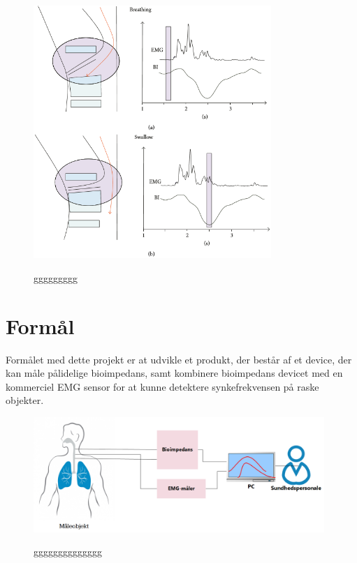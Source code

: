 \begin{figure}[H]
\centering
{\includegraphics[width=9cm]
{Figure/EMGBIGraph}}
\caption{ggggggggg\cite{Bass1992Dysphagia:Management}}
\label{EMGBIGraph}
\end{figure}

\section{Formål}

Formålet med dette projekt er at udvikle et produkt, der består af et device, der kan måle pålidelige bioimpedans, samt kombinere bioimpedans devicet med en kommerciel EMG sensor for at kunne detektere synkefrekvensen på raske objekter.


\begin{figure}[H]
\centering
{\includegraphics[width=11cm]
{Figure/KonceptuelDiagram}}
\caption{gggggggggggggg\cite{Bass1992Dysphagia:Management}}
\label{KonceptuelDiagram}
\end{figure}

